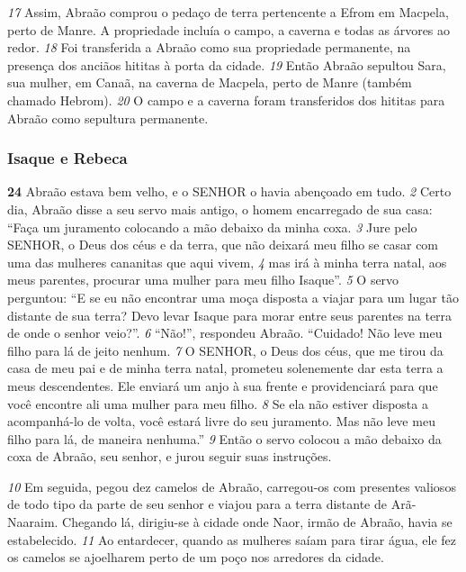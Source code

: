 \bigskip
\textit{\tiny 17}
Assim, Abraão comprou o pedaço de terra pertencente a Efrom em Macpela,
perto de Manre. A propriedade incluía o campo, a caverna e todas as árvores ao
redor. 
\textit{\tiny 18}
Foi transferida a Abraão como sua propriedade permanente, na presença
dos anciãos hititas à porta da cidade. 
\textit{\tiny 19}
Então Abraão sepultou Sara, sua mulher,
em Canaã, na caverna de Macpela, perto de Manre (também chamado Hebrom).
\textit{\tiny 20}
O campo e a caverna foram transferidos dos hititas para Abraão como sepultura
permanente.

\bigskip
\subsubsection*{Isaque e Rebeca}
\textbf{\large 24}
 Abraão estava bem velho, e o SENHOR o havia abençoado em tudo. 
\textit{\tiny 2}
Certo
dia, Abraão disse a seu servo mais antigo, o homem encarregado de sua casa:
“Faça um juramento colocando a mão debaixo da minha coxa. 
\textit{\tiny 3}
Jure pelo SENHOR,
o Deus dos céus e da terra, que não deixará meu filho se casar com uma das
mulheres cananitas que aqui vivem, 
\textit{\tiny 4}
mas irá à minha terra natal, aos meus
parentes, procurar uma mulher para meu filho Isaque”.
\textit{\tiny 5}
O servo perguntou: “E se eu não encontrar uma moça disposta a viajar para um
lugar tão distante de sua terra? Devo levar Isaque para morar entre seus parentes
na terra de onde o senhor veio?”.
\textit{\tiny 6}
“Não!”, respondeu Abraão. “Cuidado! Não leve meu filho para lá de jeito
nenhum. 
\textit{\tiny 7}
O SENHOR, o Deus dos céus, que me tirou da casa de meu pai e de minha
terra natal, prometeu solenemente dar esta terra a meus descendentes. Ele
enviará um anjo à sua frente e providenciará para que você encontre ali uma
mulher para meu filho. 
\textit{\tiny 8}
Se ela não estiver disposta a acompanhá-lo de volta, você
estará livre do seu juramento. Mas não leve meu filho para lá, de maneira
nenhuma.”
\textit{\tiny 9}
Então o servo colocou a mão debaixo da coxa de Abraão, seu senhor, e jurou
seguir suas instruções. 

\bigskip
\textit{\tiny 10}
Em seguida, pegou dez camelos de Abraão, carregou-os
com presentes valiosos de todo tipo da parte de seu senhor e viajou para a terra
distante de Arã-Naaraim. Chegando lá, dirigiu-se à cidade onde Naor, irmão de
Abraão, havia se estabelecido. 
\textit{\tiny 11}
Ao entardecer, quando as mulheres saíam para
tirar água, ele fez os camelos se ajoelharem perto de um poço nos arredores da
cidade.

